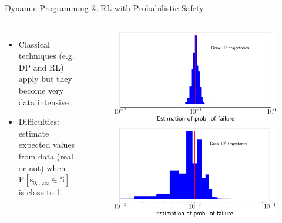 \documentclass[lecture]{beamer}
\newcommand{\vect}[1]{\ensuremath{\boldsymbol{\mathrm{#1}}}}
\begin{document}
\begin{frame}{\normalsize Dynamic Programming \& RL with Probabilistic Safety}
\begin{columns}[t]
\begin{itemize}
\item Classical techniques (e.g. DP and RL) apply but they become very data intensive
\item Difficulties: estimate expected values from data (real or not) when $\mathrm{P}\left[ \vect s_{0,\ldots\infty}\in \mathbb S\right]$ is close to 1. 
\end{itemize}


\begin{overlayarea}{\textwidth}{0.6\textheight}
    \begin{figure}
     \newcommand{\FS}{1}
        {
        \center
	\includegraphics[width=1\textwidth,clip]{Codes/BasicsSafety/SafetyEstimation3_1.pdf}
	}
	      \only<2>
        {
        \center
	\includegraphics[width=1\textwidth,clip]{Codes/BasicsSafety/SafetyEstimation3_2.pdf}
	}
	      \only<3->
        {
        \center
}
\end{figure}
\end{overlayarea}
\end{columns}
\end{frame}
\end{document}
